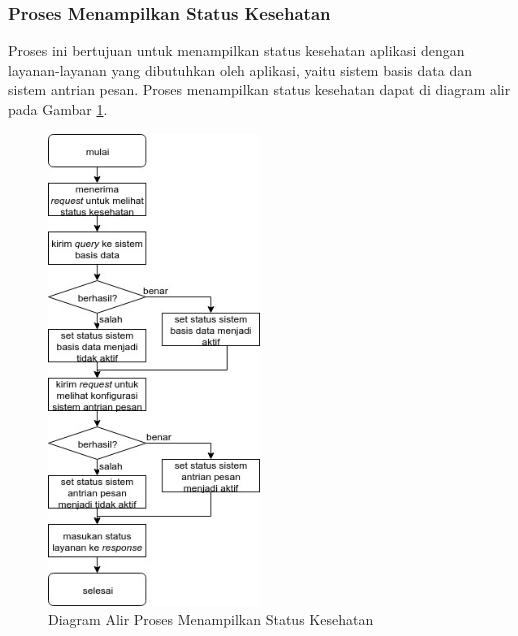 \subsubsection{Proses Menampilkan Status Kesehatan}
\par Proses ini bertujuan untuk menampilkan status kesehatan aplikasi dengan layanan-layanan yang dibutuhkan oleh aplikasi, yaitu sistem basis data dan sistem antrian pesan. Proses menampilkan status kesehatan dapat di diagram alir pada Gambar \ref{fc:kesehatan}.
\begin{figure}[H]
	\centering\includegraphics[width=0.5\textwidth]{bab3/img/flowchart-menampilkan_kesehatan.jpg}
	\caption{Diagram Alir Proses Menampilkan Status Kesehatan} \label{fc:kesehatan}
\end{figure}

\clearpage
